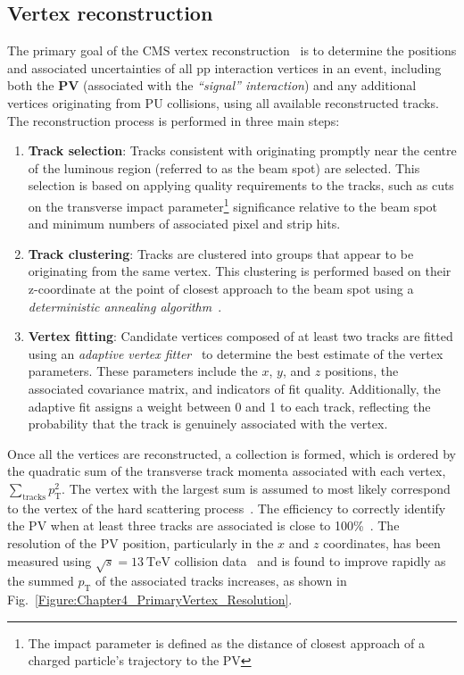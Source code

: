 \subsection{Vertex reconstruction}

The primary goal of the \ac{CMS} vertex reconstruction~\cite{CMS_TrackerPerformance_2014} is to determine the positions and associated uncertainties of all pp interaction vertices in an event, including both the \textbf{\ac{PV}} (associated with the \textit{``signal'' interaction}) and any additional vertices originating from \ac{PU} collisions, using all available reconstructed tracks. The reconstruction process is performed in three main steps: 

\begin{enumerate}
    \item \textbf{Track selection}: Tracks consistent with originating promptly near the centre of the luminous region (referred to as the beam spot) are selected. This selection is based on applying quality requirements to the tracks, such as cuts on the transverse impact parameter\footnote{The impact parameter is defined as the distance of closest approach of a charged particle’s trajectory to the PV} significance relative to the beam spot and minimum numbers of associated pixel and strip hits.
    \item \textbf{Track clustering}: Tracks are clustered into groups that appear to be originating from the same vertex. This clustering is performed based on their z-coordinate at the point of closest approach to the beam spot using a \textit{deterministic annealing algorithm}~\cite{DeterministicAnnealing}.
    \item \textbf{Vertex fitting}: Candidate vertices composed of at least two tracks are fitted using an \textit{adaptive vertex fitter}~\cite{VertexFitting_2006,VertexFitting_2007} to determine the best estimate of the vertex parameters. These parameters include the $x$, $y$, and $z$ positions, the associated covariance matrix, and indicators of fit quality. Additionally, the adaptive fit assigns a weight between 0 and 1 to each track, reflecting the probability that the track is genuinely associated with the vertex.
\end{enumerate}

Once all the vertices are reconstructed, a collection is formed, which is ordered by the quadratic sum of the transverse track momenta associated with each vertex, $\sum_{\text{tracks}} p_{\mathrm{T}}^2$. The vertex with the largest sum is assumed to most likely correspond to the vertex of the hard scattering process~\cite{ParticleFlow}. The efficiency to correctly identify the PV when at least three tracks are associated is close to 100\%~\cite{CMS_TrackerPerformance_2014}. The resolution of the PV position, particularly in the $x$ and $z$ coordinates, has been measured using $\sqrt{s} = 13\ \mathrm{TeV}$ collision data~\cite{PrimaryVertex_Resolution} and is found to improve rapidly as the summed $p_{\mathrm{T}}$ of the associated tracks increases, as shown in Fig.~\ref{Figure:Chapter4_PrimaryVertex_Resolution}.

